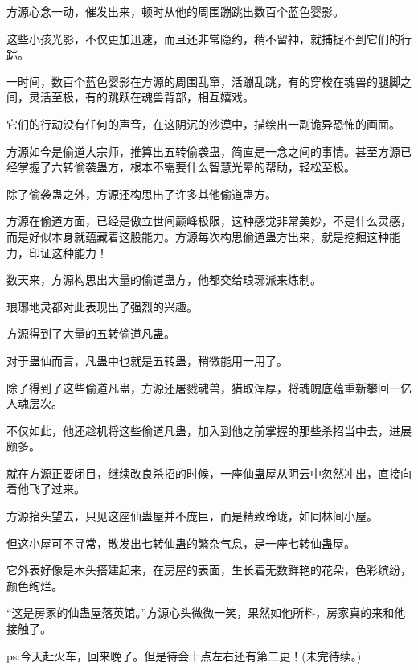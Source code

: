 \begin{this_body}
方源心念一动，催发出来，顿时从他的周围蹦跳出数百个蓝色婴影。

这些小孩光影，不仅更加迅速，而且还非常隐约，稍不留神，就捕捉不到它们的行踪。

一时间，数百个蓝色婴影在方源的周围乱窜，活蹦乱跳，有的穿梭在魂兽的腿脚之间，灵活至极，有的跳跃在魂兽背部，相互嬉戏。

它们的行动没有任何的声音，在这阴沉的沙漠中，描绘出一副诡异恐怖的画面。

方源如今是偷道大宗师，推算出五转偷袭蛊，简直是一念之间的事情。甚至方源已经掌握了六转偷袭蛊方，根本不需要什么智慧光晕的帮助，轻松至极。

除了偷袭蛊之外，方源还构思出了许多其他偷道蛊方。

方源在偷道方面，已经是傲立世间巅峰极限，这种感觉非常美妙，不是什么灵感，而是好似本身就蕴藏着这股能力。方源每次构思偷道蛊方出来，就是挖掘这种能力，印证这种能力！

数天来，方源构思出大量的偷道蛊方，他都交给琅琊派来炼制。

琅琊地灵都对此表现出了强烈的兴趣。

方源得到了大量的五转偷道凡蛊。

对于蛊仙而言，凡蛊中也就是五转蛊，稍微能用一用了。

除了得到了这些偷道凡蛊，方源还屠戮魂兽，猎取浑厚，将魂魄底蕴重新攀回一亿人魂层次。

不仅如此，他还趁机将这些偷道凡蛊，加入到他之前掌握的那些杀招当中去，进展颇多。

就在方源正要闭目，继续改良杀招的时候，一座仙蛊屋从阴云中忽然冲出，直接向着他飞了过来。

方源抬头望去，只见这座仙蛊屋并不庞巨，而是精致玲珑，如同林间小屋。

但这小屋可不寻常，散发出七转仙蛊的繁杂气息，是一座七转仙蛊屋。

它外表好像是木头搭建起来，在房屋的表面，生长着无数鲜艳的花朵，色彩缤纷，颜色绚烂。

“这是房家的仙蛊屋落英馆。”方源心头微微一笑，果然如他所料，房家真的来和他接触了。

ps:今天赶火车，回来晚了。但是待会十点左右还有第二更！(未完待续。)

\end{this_body}

